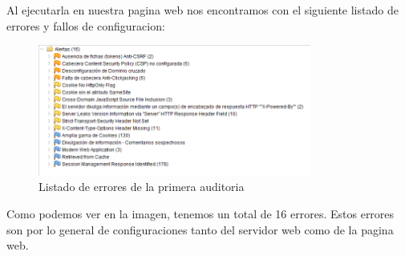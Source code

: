 \documentclass{report}
\begin{document}
            Al ejecutarla en nuestra pagina web nos encontramos con el siguiente listado de errores y fallos de configuracion:
            \begin{figure}[H]
                \centering
                \includegraphics[width=0.8\textwidth]{./img/audit1/zap1.png}
                \caption{Listado de errores de la primera auditoria}
            \end{figure}
            Como podemos ver en la imagen, tenemos un total de 16 errores.
            Estos errores son por lo general de configuraciones tanto del servidor web como de la pagina web.

        \clearpage
\end{document}
